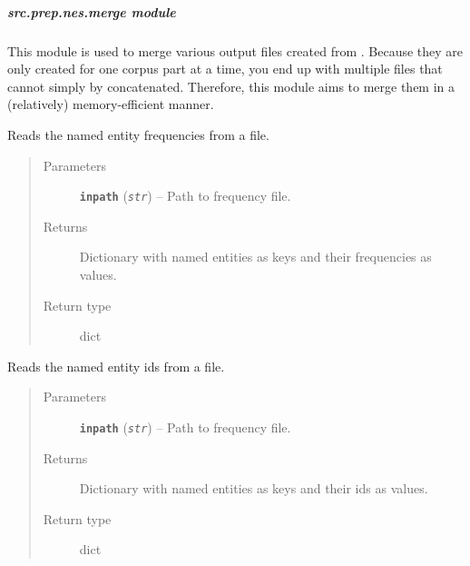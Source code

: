 \documentclass[letterpaper,10pt,english]{sphinxmanual}
\begin{document}
\subparagraph{src.prep.nes.merge module}
\label{src.prep.nes:src-prep-nes-merge-module}\label{src.prep.nes:module-src.prep.nes.merge}
This module is used to merge various output files created from . Because they are only created
for one corpus part at a time, you end up with multiple files that cannot simply by concatenated. Therefore, this module
aims to merge them in a (relatively) memory-efficient manner.

\begin{fulllineitems}
\label{src.prep.nes:src.prep.nes.merge.freq_worker}
Reads the named entity frequencies from a file.
\begin{quote}\begin{description}
\item[{Parameters}] \leavevmode
\textbf{\texttt{inpath}} (\emph{\texttt{str}}) -- Path to frequency file.

\item[{Returns}] \leavevmode
Dictionary with named entities as keys and their frequencies as values.

\item[{Return type}] \leavevmode
dict

\end{description}\end{quote}

\end{fulllineitems}


\begin{fulllineitems}
\label{src.prep.nes:src.prep.nes.merge.id_worker}
Reads the named entity ids from a file.
\begin{quote}\begin{description}
\item[{Parameters}] \leavevmode
\textbf{\texttt{inpath}} (\emph{\texttt{str}}) -- Path to frequency file.

\item[{Returns}] \leavevmode
Dictionary with named entities as keys and their ids as values.

\item[{Return type}] \leavevmode
dict

\end{description}\end{quote}

\end{fulllineitems}
\end{document}

